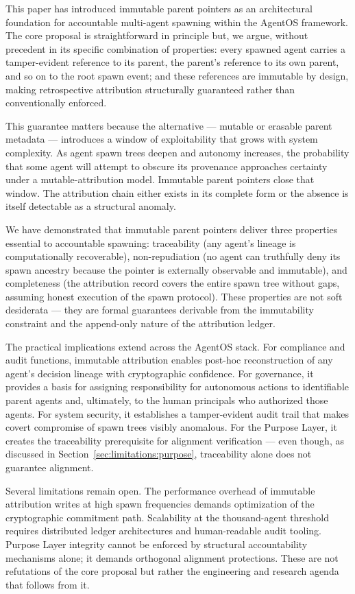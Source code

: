 This paper has introduced immutable parent pointers as an architectural foundation for accountable multi-agent spawning within the AgentOS framework. The core proposal is straightforward in principle but, we argue, without precedent in its specific combination of properties: every spawned agent carries a tamper-evident reference to its parent, the parent's reference to its own parent, and so on to the root spawn event; and these references are immutable by design, making retrospective attribution structurally guaranteed rather than conventionally enforced.

This guarantee matters because the alternative — mutable or erasable parent metadata — introduces a window of exploitability that grows with system complexity. As agent spawn trees deepen and autonomy increases, the probability that some agent will attempt to obscure its provenance approaches certainty under a mutable-attribution model. Immutable parent pointers close that window. The attribution chain either exists in its complete form or the absence is itself detectable as a structural anomaly.

We have demonstrated that immutable parent pointers deliver three properties essential to accountable spawning: traceability (any agent's lineage is computationally recoverable), non-repudiation (no agent can truthfully deny its spawn ancestry because the pointer is externally observable and immutable), and completeness (the attribution record covers the entire spawn tree without gaps, assuming honest execution of the spawn protocol). These properties are not soft desiderata — they are formal guarantees derivable from the immutability constraint and the append-only nature of the attribution ledger.

The practical implications extend across the AgentOS stack. For compliance and audit functions, immutable attribution enables post-hoc reconstruction of any agent's decision lineage with cryptographic confidence. For governance, it provides a basis for assigning responsibility for autonomous actions to identifiable parent agents and, ultimately, to the human principals who authorized those agents. For system security, it establishes a tamper-evident audit trail that makes covert compromise of spawn trees visibly anomalous. For the Purpose Layer, it creates the traceability prerequisite for alignment verification — even though, as discussed in Section~\ref{sec:limitations:purpose}, traceability alone does not guarantee alignment.

Several limitations remain open. The performance overhead of immutable attribution writes at high spawn frequencies demands optimization of the cryptographic commitment path. Scalability at the thousand-agent threshold requires distributed ledger architectures and human-readable audit tooling. Purpose Layer integrity cannot be enforced by structural accountability mechanisms alone; it demands orthogonal alignment protections. These are not refutations of the core proposal but rather the engineering and research agenda that follows from it.

